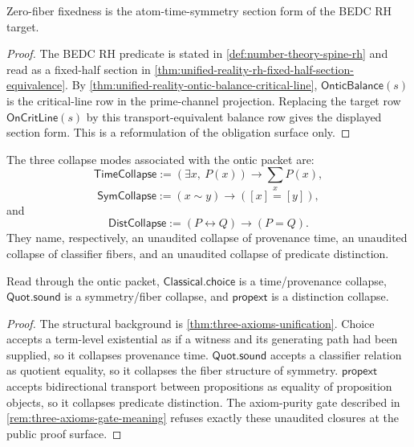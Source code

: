 \begin{theorem}
\label{thm:unified-reality-zero-fiber-fixedness-rh-form}
Zero-fiber fixedness is the atom-time-symmetry section form of the BEDC
RH target.
\end{theorem}

\begin{proof}
The BEDC RH predicate is stated in \autoref{def:number-theory-spine-rh}
and read as a fixed-half section in
\autoref{thm:unified-reality-rh-fixed-half-section-equivalence}. By
\autoref{thm:unified-reality-ontic-balance-critical-line},
$\mathsf{OnticBalance}(s)$ is the critical-line row in the prime-channel
projection. Replacing the target row $\mathsf{OnCritLine}(s)$ by this
transport-equivalent balance row gives the displayed section form. This
is a reformulation of the obligation surface only.
\end{proof}

\begin{definition}
\label{def:unified-reality-ontic-collapse-modes}
The three collapse modes associated with the ontic packet are:
$$
\mathsf{TimeCollapse}
:=
(\exists x,\ P(x))\to\sum_x P(x),
$$
$$
\mathsf{SymCollapse}
:=
(x\sim y)\to([x]=[y]),
$$
and
$$
\mathsf{DistCollapse}
:=
(P\leftrightarrow Q)\to(P=Q).
$$
They name, respectively, an unaudited collapse of provenance time, an
unaudited collapse of classifier fibers, and an unaudited collapse of
predicate distinction.
\end{definition}

\begin{theorem}
\label{thm:unified-reality-excluded-axioms-collapse-modes}
Read through the ontic packet, $\mathsf{Classical.choice}$ is a
time/provenance collapse, $\mathsf{Quot.sound}$ is a symmetry/fiber
collapse, and $\mathsf{propext}$ is a distinction collapse.
\end{theorem}

\begin{proof}
The structural background is
\autoref{thm:three-axioms-unification}. Choice accepts a term-level
existential as if a witness and its generating path had been supplied,
so it collapses provenance time. $\mathsf{Quot.sound}$ accepts a
classifier relation as quotient equality, so it collapses the fiber
structure of symmetry. $\mathsf{propext}$ accepts bidirectional
transport between propositions as equality of proposition objects, so it
collapses predicate distinction. The axiom-purity gate described in
\autoref{rem:three-axioms-gate-meaning} refuses exactly these
unaudited closures at the public proof surface.
\end{proof}

